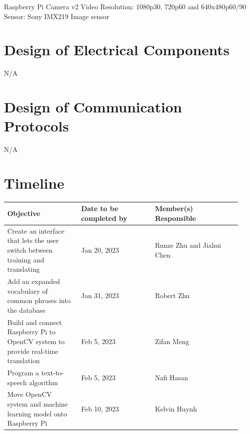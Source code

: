 \documentclass[12pt, titlepage]{article}
\begin{document}
Raspberry Pi Camera v2
Video Resolution: 1080p30, 720p60 and 640x480p60/90
Sensor: Sony IMX219 Image sensor

\section{Design of Electrical Components}

N/A

\section{Design of Communication Protocols}

N/A

\section{Timeline}


\renewcommand{\arraystretch}{1.2}
\noindent \begin{tabularx}{\textwidth}{p{0.3\linewidth}|p{0.3\linewidth}|p{0.35\linewidth}}
\toprule
\textbf{Objective} & \textbf{Date to be completed by} & \textbf{Member(s) Responsible}\\
\midrule
Create an interface that lets the user switch between training and translating & Jan 20, 2023 & Runze Zhu and Jiahui Chen\\
\hline
Add an expanded vocabulary of common phrases into the database & Jan 31, 2023 & Robert Zhu\\
\hline
Build and connect Raspberry Pi to OpenCV system to provide real-time translation & Feb 5, 2023 & Zifan Meng\\
\hline
Program a text-to-speech algorithm & Feb 5, 2023 & Nafi Hasan\\
\hline
Move OpenCV system and machine learning model onto Raspberry Pi & Feb 10, 2023 & Kelvin Huynh\\
\bottomrule
\end{tabularx}

% 

\newpage{}

\appendix

\end{document}
